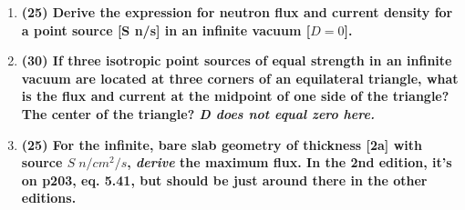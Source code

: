 \documentclass[11pt,a4paper]{article}
\begin{document}
\begin{enumerate}[leftmargin=*,topsep=0pt,font=\bfseries]
        
        \newpage 
    \item\textbf{(25) Derive the expression for neutron flux and current density for a point source [S n/s] in an infinite vacuum [$D = 0$].}
        \vspace{0.25in}\\
















        \newpage 
    \item\textbf{(30) If three isotropic point sources of equal strength in an infinite vacuum are located at three corners of an equilateral triangle, what is the flux and current at the midpoint of one side of the triangle? The center of the triangle? \textit{D does not equal zero here.}}
        \vspace{0.25in}\\













        \newpage 
    \item\textbf{(25) For the infinite, bare slab geometry of thickness [2a] with source $S \; n/cm^2/s$, \textit{derive} the maximum flux. In the 2nd edition, it's on p203, eq. 5.41, but should be just around there in the other editions.}
        \vspace{0.25in}\\



















\end{enumerate}
\end{document}
